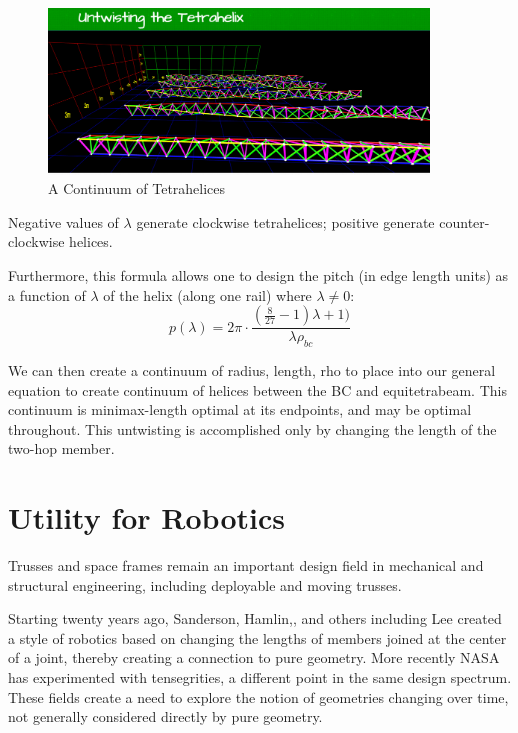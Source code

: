 \documentclass[11pt]{article}
\begin{document}
 \begin{figure}[H]
     \centering
     \includegraphics[width=0.9\textwidth]{figures/Continuum.png}
     \caption{A Continuum of Tetrahelices}
 \end{figure}


Negative values of $\lambda$ generate clockwise tetrahelices; positive generate counter-clockwise helices.

Furthermore, this formula allows one to design the pitch (in edge length units) as a function of $\lambda$ of the helix (along one rail)
where $\lambda \neq 0$:
\[
p(\lambda) = 2 \pi  \cdot \frac{(\frac{8}{27} -1) \lambda +1)}{ \lambda  \rho_{bc} }
\]

We can then create a continuum of radius, length, rho to place into our general equation
to create continuum of helices between the BC and equitetrabeam. This continuum is 
minimax-length optimal at its endpoints, and may be optimal throughout. This untwisting is accomplished
only by changing the length of the two-hop member.

\section{Utility for Robotics}

Trusses and space frames remain an important design field in mechanical and structural engineering\cite{mikulas1985sequentially},
including deployable and moving trusses\cite{claypool2012readily}.

Starting twenty years ago, Sanderson\cite{sanderson1996modular}, Hamlin,\cite{TetrobotBook}, and others including Lee\cite{lee2002dynamic}
created a style of robotics based on changing the lengths of members
joined at the center of a joint, thereby creating a connection to pure geometry. More recently NASA has experimented with
tensegrities\cite{NTRT}, a different point in the same design spectrum. These fields create a need to explore the notion of
geometries changing over time, not generally considered directly by pure geometry.
\end{document}
